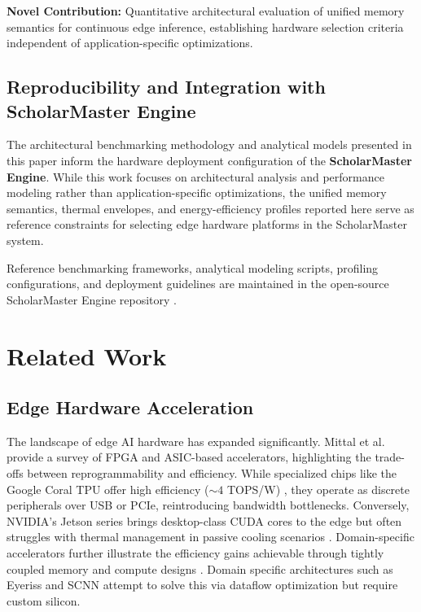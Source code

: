 \documentclass[conference]{IEEEtran}
\begin{document}
\textbf{Novel Contribution:} Quantitative architectural evaluation of unified memory semantics for continuous edge inference, establishing hardware selection criteria independent of application-specific optimizations.

\subsection{Reproducibility and Integration with ScholarMaster Engine}
The architectural benchmarking methodology and analytical models presented in this paper inform the hardware deployment configuration of the \textbf{ScholarMaster Engine}. While this work focuses on architectural analysis and performance modeling rather than application-specific optimizations, the unified memory semantics, thermal envelopes, and energy-efficiency profiles reported here serve as reference constraints for selecting edge hardware platforms in the ScholarMaster system.

Reference benchmarking frameworks, analytical modeling scripts, profiling configurations, and deployment guidelines are maintained in the open-source ScholarMaster Engine repository \cite{scholarmaster_repo}.

\section{Related Work}

\subsection{Edge Hardware Acceleration}
The landscape of edge AI hardware has expanded significantly. Mittal et al. \cite{b3} provide a survey of FPGA and ASIC-based accelerators, highlighting the trade-offs between reprogrammability and efficiency. While specialized chips like the Google Coral TPU offer high efficiency ($\sim 4$ TOPS/W) \cite{b7}, they operate as discrete peripherals over USB or PCIe, reintroducing bandwidth bottlenecks. Conversely, NVIDIA's Jetson series brings desktop-class CUDA cores to the edge but often struggles with thermal management in passive cooling scenarios \cite{b21}. Domain-specific accelerators further illustrate the efficiency gains achievable through tightly coupled memory and compute designs \cite{b25}. Domain specific architectures such as Eyeriss \cite{b26} and SCNN \cite{b27} attempt to solve this via dataflow optimization but require custom silicon.
\end{document}
